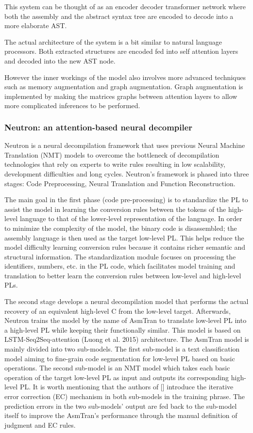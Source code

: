 \documentclass[conference,a4paper]{IEEEtran}
\begin{document}
This system can be thought of as an encoder decoder transformer network where both the assembly and the abstract syntax tree are encoded to decode into a more elaborate AST.

The actual architecture of the system is a bit similar to natural language processors.
Both extracted structures are encoded fed into self attention layers and decoded into the new AST node.

However the inner workings of the model also involves more advanced techniques such as memory augmentation and graph augmentation.
Graph augmentation is implemented by making the matrices graphs between attention layers to allow more complicated inferences to be performed.

\subsubsection{Neutron: an attention-based neural decompiler}

Neutron is a neural decompilation framework that uses previous Neural Machine Translation (NMT) models to overcome the bottleneck of decompilation technologies that rely on experts to write rules resulting in low scalability, development difficulties and long cycles.
Neutron’s framework is phased into three stages: Code Preprocessing, Neural Translation and Function Reconstruction.

The main goal in the first phase (code pre-processing) is to standardize the PL to assist the model in learning the conversion rules between the tokens of the high-level language to that of the lower-level representation of the language.
In order to minimize the complexity of the model, the binary code is disassembled; the assembly language is then used as the target low-level PL.
This helps reduce the model difficulty learning conversion rules because it contains richer semantic and structural information.
The standardization module focuses on processing the identifiers, numbers, etc. in the PL code, which facilitates model training and translation to better learn the conversion rules between low-level and high-level PLs.

The second stage develops a neural decompilation model that performs the actual recovery of an equivalent high-level C from the low-level target.
Afterwards, Neutron trains the model by the name of AsmTran to translate low-level PL into a high-level PL while keeping their functionally similar.
This model is based on LSTM-Seq2Seq-attention (Luong et al. 2015) architecture.
The AsmTran model is mainly divided into two sub-models.
The first sub-model is a text classification model aiming to fine-grain code segmentation for low-level PL based on basic operations.
The second sub-model is an NMT model which takes each basic operation of the target low-level PL as input and outputs its corresponding high-level PL.
It is worth mentioning that the authors of [] introduce the iterative error correction (EC) mechanism in both sub-models in the training phrase.
The prediction errors in the two sub-models’ output are fed back to the sub-model itself to improve the AsmTran’s performance through the manual definition of judgment and EC rules.
\end{document}
